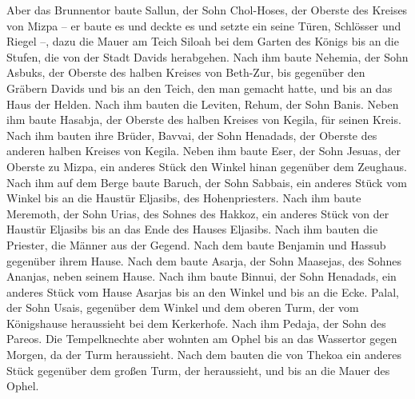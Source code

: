  Aber das Brunnentor baute Sallun, der Sohn Chol-Hoses,
der Oberste des Kreises von Mizpa -- er baute es und deckte es und
setzte ein seine Türen, Schlösser und Riegel --, dazu die Mauer am Teich
Siloah bei dem Garten des Königs bis an die Stufen, die von der Stadt
Davids herabgehen.  Nach ihm baute Nehemia, der Sohn
Asbuks, der Oberste des halben Kreises von Beth-Zur, bis gegenüber den
Gräbern Davids und bis an den Teich, den man gemacht hatte, und bis an
das Haus der Helden.  Nach ihm bauten die Leviten, Rehum,
der Sohn Banis. Neben ihm baute Hasabja, der Oberste des halben Kreises
von Kegila, für seinen Kreis.  Nach ihm bauten ihre
Brüder, Bavvai, der Sohn Henadads, der Oberste des anderen halben
Kreises von Kegila.  Neben ihm baute Eser, der Sohn
Jesuas, der Oberste zu Mizpa, ein anderes Stück den Winkel hinan
gegenüber dem Zeughaus.  Nach ihm auf dem Berge baute
Baruch, der Sohn Sabbais, ein anderes Stück vom Winkel bis an die
Haustür Eljasibs, des Hohenpriesters.  Nach ihm baute
Meremoth, der Sohn Urias, des Sohnes des Hakkoz, ein anderes Stück von
der Haustür Eljasibs bis an das Ende des Hauses Eljasibs.
 Nach ihm bauten die Priester, die Männer aus der Gegend.
 Nach dem baute Benjamin und Hassub gegenüber ihrem
Hause. Nach dem baute Asarja, der Sohn Maasejas, des Sohnes Ananjas,
neben seinem Hause.  Nach ihm baute Binnui, der Sohn
Henadads, ein anderes Stück vom Hause Asarjas bis an den Winkel und bis
an die Ecke.  Palal, der Sohn Usais, gegenüber dem Winkel
und dem oberen Turm, der vom Königshause heraussieht bei dem Kerkerhofe.
Nach ihm Pedaja, der Sohn des Pareos.  Die Tempelknechte
aber wohnten am Ophel bis an das Wassertor gegen Morgen, da der Turm
heraussieht.  Nach dem bauten die von Thekoa ein anderes
Stück gegenüber dem großen Turm, der heraussieht, und bis an die Mauer
des Ophel.

